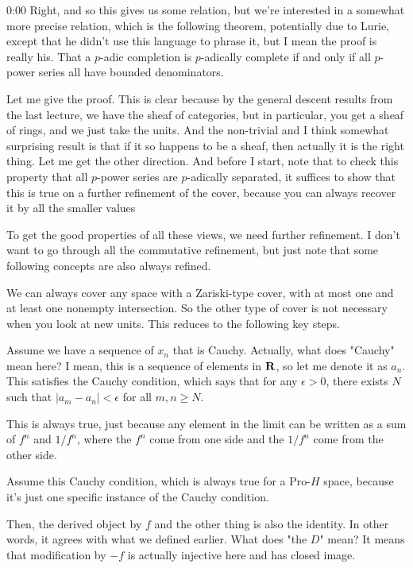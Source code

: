 \begin{unfinished}{0:00}
Right, and so this gives us some relation, but we're interested in a somewhat more precise relation, which is the following theorem, potentially due to Lurie, except that he didn't use this language to phrase it, but I mean the proof is really his. That a $p$-adic completion is $p$-adically complete if and only if all $p$-power series all have bounded denominators. 

Let me give the proof. This is clear because by the general descent results from the last lecture, we have the sheaf of categories, but in particular, you get a sheaf of rings, and we just take the units. And the non-trivial and I think somewhat surprising result is that if it so happens to be a sheaf, then actually it is the right thing. Let me get the other direction. And before I start, note that to check this property that all $p$-power series are $p$-adically separated, it suffices to show that this is true on a further refinement of the cover, because you can always recover it by all the smaller values

To get the good properties of all these views, we need further refinement. I don't want to go through all the commutative refinement, but just note that some following concepts are also always refined.

We can always cover any space with a Zariski-type cover, with at most one and at least one nonempty intersection. So the other type of cover is not necessary when you look at new units. This reduces to the following key steps.

Assume we have a sequence of $x_n$ that is Cauchy. Actually, what does "Cauchy" mean here? I mean, this is a sequence of elements in $\mathbf R$, so let me denote it as $a_n$. This satisfies the Cauchy condition, which says that for any $\epsilon > 0$, there exists $N$ such that $|a_m - a_n| < \epsilon$ for all $m, n \geq N$. 

This is always true, just because any element in the limit can be written as a sum of $f^n$ and $1/f^n$, where the $f^n$ come from one side and the $1/f^n$ come from the other side.

Assume this Cauchy condition, which is always true for a Pro-$H$ space, because it's just one specific instance of the Cauchy condition.

Then, the derived object by $f$ and the other thing is also the identity. In other words, it agrees with what we defined earlier. What does "the $D$" mean? It means that modification by $-f$ is actually injective here and has closed image.


\end{unfinished}
